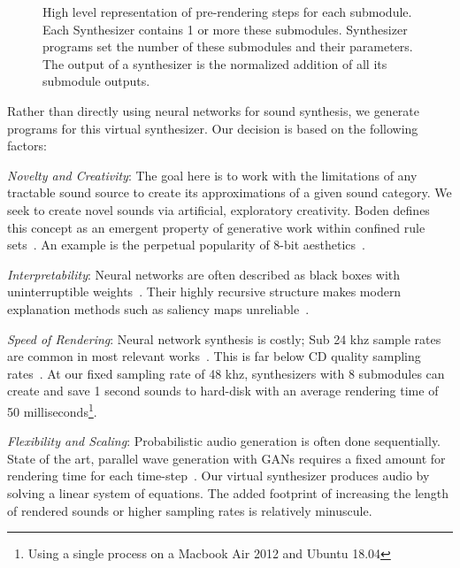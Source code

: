 \documentclass[runningheads,a4paper]{llncs}
\begin{document}
 \begin{figure}[tbp]
    \begin{center}
    \end{center}
    \caption{High level representation of pre-rendering steps for each submodule. Each Synthesizer contains 1 or more these submodules. Synthesizer programs set the number of these submodules and their parameters. The output of a synthesizer is the normalized addition of all its submodule outputs. 
    }
\label{fig:submodule}
\end{figure}

 Rather than directly using neural networks for sound synthesis, we generate programs for this virtual synthesizer. Our decision is based on the following factors:
\begin{enumerate*}[label=(\roman*)]
    \item \textit{Novelty and Creativity}: The goal here is to work with the limitations of any tractable sound source to create its approximations of a given sound category. We seek to create novel sounds via artificial, exploratory creativity. Boden defines this concept as an emergent property of generative work within confined rule sets~\cite{boden2009computer}. An example is the perpetual popularity of 8-bit aesthetics~\cite{collins2007loop}. 
    \item \textit{Interpretability}: Neural networks are often described as black boxes with uninterruptible weights~\cite{basheer2000artificial}. Their highly recursive structure makes modern explanation methods such as saliency maps unreliable~\cite{rudin2019stop}.  
    \item \textit{Speed of Rendering}: Neural network synthesis is costly; Sub 24 khz sample rates are common in most relevant works~\cite{yamamoto2020parallel,oord2017parallel,aouameur2019neural,ramires2020neural}. This is far below CD quality sampling rates~\cite{reiss2016meta}. At our fixed sampling rate of 48 khz, synthesizers with 8 submodules can create and save 1 second sounds to hard-disk with an average rendering time of 50 milliseconds\footnote{Using a single process on a Macbook Air 2012 and Ubuntu 18.04}. 
    \item \textit{Flexibility and Scaling}: Probabilistic audio generation is often done sequentially. State of the art, parallel wave generation with GANs requires a fixed amount for rendering time for each time-step~\cite{yamamoto2020parallel}. Our virtual synthesizer produces audio by solving a linear system of equations. The added footprint of increasing the length of rendered sounds or higher sampling rates is relatively minuscule.  
\end{enumerate*}
\end{document}

